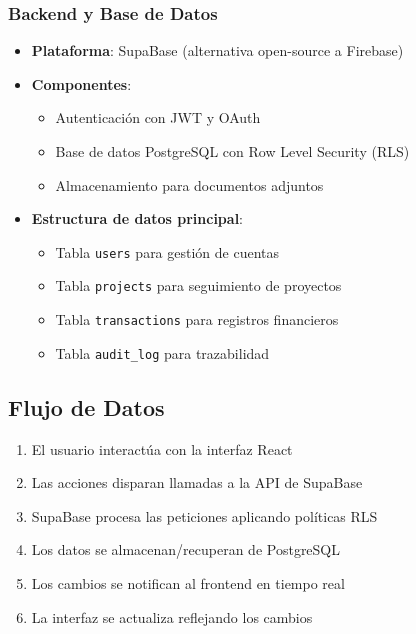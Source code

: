 \subsubsection{Backend y Base de Datos}
\begin{itemize}
    \item \textbf{Plataforma}: SupaBase (alternativa open-source a Firebase)
    \item \textbf{Componentes}:
    \begin{itemize}
        \item Autenticación con JWT y OAuth
        \item Base de datos PostgreSQL con Row Level Security (RLS)
        \item Almacenamiento para documentos adjuntos
    \end{itemize}
    \item \textbf{Estructura de datos principal}:
    \begin{itemize}
        \item Tabla \texttt{users} para gestión de cuentas
        \item Tabla \texttt{projects} para seguimiento de proyectos
        \item Tabla \texttt{transactions} para registros financieros
        \item Tabla \texttt{audit\_log} para trazabilidad
    \end{itemize}
\end{itemize}

\subsection{Flujo de Datos}
\begin{enumerate}
    \item El usuario interactúa con la interfaz React
    \item Las acciones disparan llamadas a la API de SupaBase
    \item SupaBase procesa las peticiones aplicando políticas RLS
    \item Los datos se almacenan/recuperan de PostgreSQL
    \item Los cambios se notifican al frontend en tiempo real
    \item La interfaz se actualiza reflejando los cambios
\end{enumerate}

